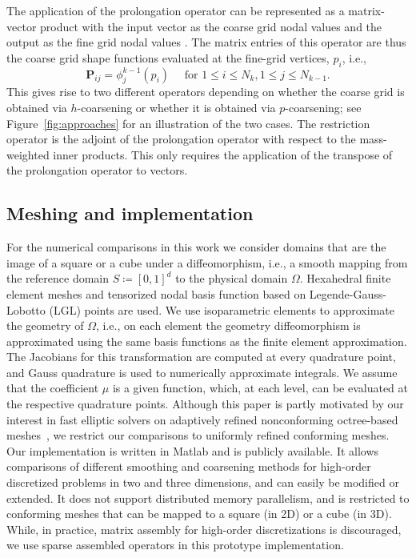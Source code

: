 \documentclass[smallcondensed,final]{svjour3}     %
\begin{document}
The application of the prolongation operator can be represented as a matrix-vector
product with the input vector as the coarse grid nodal values and the
output as the fine grid nodal values \cite{SampathBiros10}. The matrix
entries of this operator are thus the coarse grid shape functions evaluated at the fine-grid
vertices, $p_i$, i.e.,
\begin{equation}
	\label{eq:Pstencil}
	\mathbf P_{\!ij} = \phi_j^{k-1}(p_i) \quad \text{ for } 1\le i \le N_k, 1\le j\le N_{k-1}. 
\end{equation}
This gives rise to two different operators depending on whether the
coarse grid is obtained via $h$-coarsening or whether it is obtained
via $p$-coarsening; see Figure~\ref{fig:approaches} for an
illustration of the two cases. The restriction operator is the adjoint
of the prolongation operator with respect to the mass-weighted inner
products. This only requires the application of the transpose of the
prolongation operator to vectors. %


\subsection{Meshing and implementation} %
\label{sub:meshing}

For the numerical comparisons in this work we consider domains that
are the image of a square or a cube under a
diffeomorphism, i.e., a smooth mapping from the reference domain
$S\coloneqq[0,1]^d$ to the physical domain $\Omega$. Hexahedral finite
element meshes and tensorized nodal basis function based on
Legende-Gauss-Lobotto (LGL) points are used.  We use isoparametric
elements to approximate the geometry of $\Omega$, i.e., on each element the geometry
diffeomorphism is approximated using the same basis
functions as the
finite element approximation. The Jacobians for this transformation
are computed at every quadrature point, and Gauss quadrature is used
to numerically approximate integrals.
We assume that the coefficient $\mu$ is a given function, which, at each level, can be evaluated at the respective quadrature points.
Although this paper is partly
motivated by our interest in fast elliptic solvers on adaptively
refined nonconforming octree-based
meshes~\cite{SundarBirosBursteddeEtAl12, SampathBiros10}, 
we restrict our comparisons to uniformly refined conforming meshes.
Our implementation is written in Matlab and is publicly available. It allows comparisons of different smoothing and
coarsening methods for high-order discretized problems in two and three dimensions, and can
easily be modified or extended. It does not support distributed memory
parallelism, and is
restricted to conforming meshes that can be mapped to a square (in 2D) or a
cube (in 3D). While, in practice, matrix assembly for
high-order discretizations is discouraged, we use sparse
assembled operators in this prototype implementation.
\end{document}

